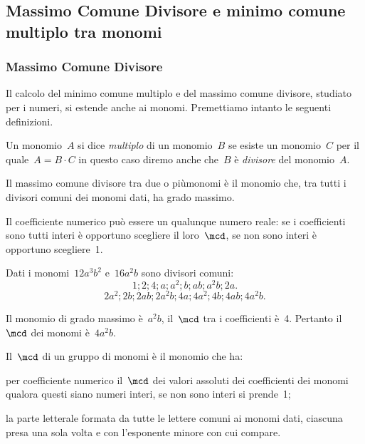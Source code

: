 
\subsection{Massimo Comune Divisore e minimo comune multiplo tra monomi}
\label{subsec:09_monomi_mcdemcm}

\subsubsection{Massimo Comune Divisore}

Il calcolo del minimo comune multiplo e del massimo comune divisore,
studiato per i numeri, si estende anche ai monomi. Premettiamo intanto
le seguenti definizioni.

\begin{definizione}
 Un monomio~$A$ si dice \emph{multiplo} di un monomio~$B$ se esiste un
monomio~$C$ per il quale~$A=B\cdot C$ in questo caso diremo anche che~$B$
è \emph{divisore} del monomio~$A$.
\end{definizione}

\begin{definizione}
 Il massimo comune divisore tra due o piùmonomi è il
monomio che, tra tutti i divisori comuni dei monomi dati, ha grado
massimo.
\end{definizione}

Il coefficiente numerico può essere un qualunque numero reale: se i
coefficienti sono tutti interi è opportuno scegliere il loro~$\mcd$,
se non sono interi è opportuno scegliere~1.

\begin{exrig}
 \begin{esempio}
Dati i monomi~$12a^{3}b^{2}$ e~$16a^{2}b$ sono divisori
comuni:
\[1; 2; 4; a; a^{2}; b; ab; a^{2}b; 2a.\]
\[2a^{2}; 2b; 2ab; 2a^{2}b; 4a; 4a^{2}; 4b; 4ab; 4a^{2}b.\]

Il monomio di grado massimo è~$a^{2}b$, il~$\mcd$ tra i coefficienti
è~4. Pertanto il~$\mcd$ dei monomi è~$4a^{2}b$.
 \end{esempio}
\end{exrig}

\begin{procedura}

Il~$\mcd$ di un gruppo di monomi è il monomio che ha:

\begin{enumeratea}
 \item per coefficiente numerico il~$\mcd$ dei valori assoluti dei
coefficienti dei monomi qualora
questi siano numeri interi, se non sono interi si prende~1;
 \item la parte letterale formata da tutte le lettere comuni ai monomi
dati, ciascuna presa una sola volta e con l'esponente minore con cui compare.
\end{enumeratea}
\end{procedura}

